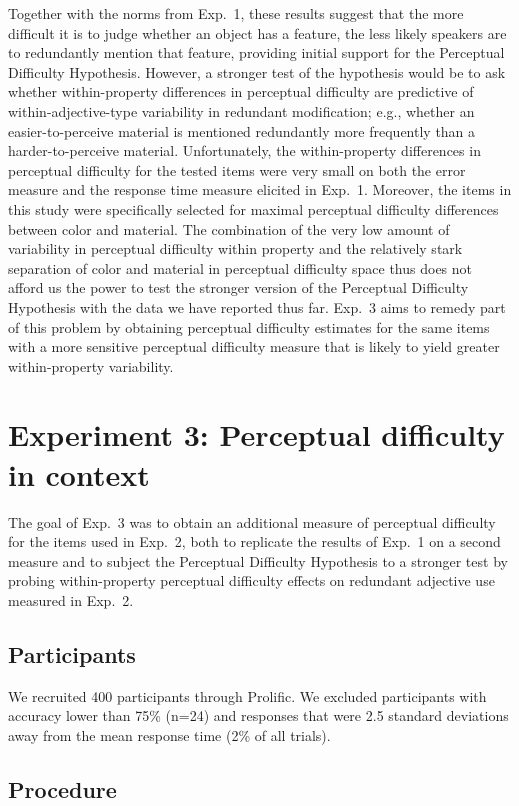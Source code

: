 \documentclass[12pt,letterpaper]{article}
\begin{document}
Together with the norms from Exp.~1, these results suggest that the more difficult it is to judge whether an object has a feature, the less likely speakers are to redundantly mention that feature, providing initial support for the Perceptual Difficulty Hypothesis. However, a stronger test of the hypothesis would be to ask whether within-property differences in perceptual difficulty are predictive of within-adjective-type variability in redundant modification; e.g., whether an easier-to-perceive material is mentioned redundantly more frequently than a harder-to-perceive material. Unfortunately, the within-property differences in perceptual difficulty for the tested items were very small on both the error measure and the response time measure elicited in Exp.~1. Moreover, the items in this study were specifically selected for maximal perceptual difficulty differences between color and material. The combination of the very low amount of variability in perceptual difficulty within property and the relatively stark separation of color and material in perceptual difficulty space thus does not afford us the power to test the stronger version of the Perceptual Difficulty Hypothesis with the data we have reported thus far. Exp.~3 aims to remedy part of this problem by obtaining perceptual difficulty estimates for the same items with a more sensitive perceptual difficulty measure that is likely to yield greater within-property variability.

\section{Experiment 3: Perceptual difficulty in context} 

The goal of Exp.~3 was to obtain an additional measure of perceptual difficulty for the items used in Exp.~2, both to replicate the results of Exp.~1 on a second measure and to subject the Perceptual Difficulty Hypothesis to a stronger test by probing within-property perceptual difficulty effects on redundant adjective use measured in Exp.~2.

\subsection{Participants} 

We recruited 400 participants through Prolific. We excluded participants with accuracy lower than 75\% (n=24) and responses that were 2.5 standard deviations away from the mean response time (2\% of all trials).
\subsection{Procedure} 
\end{document}
